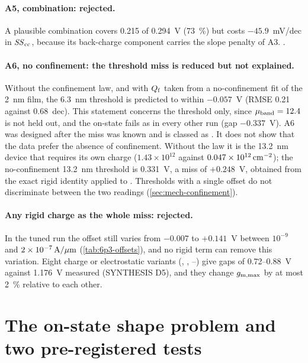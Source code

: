 \paragraph{A5, combination: rejected.} A plausible combination covers 0.215 of 0.294~V (73~\%) but costs $-45.9$~mV/dec in $\mathit{SS}_{\mathrm{cc}}$, because its back-charge component carries the slope penalty of A3. \evNUM.

\paragraph{A6, no confinement: the threshold miss is reduced but not explained.} Without the confinement law, and with $Q_{\mathrm{f}}$ taken from a no-confinement fit of the 2~nm film, the 6.3~nm threshold is predicted to within $-0.057$~V (RMSE 0.21 against 0.68~dec). This statement concerns the threshold only, since $\mu_{\mathrm{band}}=12.4$ is not held out, and the on-state fails as in every other run (gap $-0.337$~V). A6 was designed after the  miss was known and is classed as \evPOST. It does not show that the data prefer the absence of confinement. Without the law it is the 13.2~nm device that requires its own charge ($1.43\times10^{12}$ against $0.047\times10^{12}\,\mathrm{cm}^{-2}$); the no-confinement 13.2~nm threshold is 0.331~V, a miss of $+0.248$~V, obtained from the exact rigid identity applied to . Thresholds with a single offset do not discriminate between the two readings (\cref{sec:mech-confinement}).

\paragraph{Any rigid charge as the whole miss: rejected.} In the tuned run the offset still varies from $-0.007$ to $+0.141$~V between $10^{-9}$ and $2\times10^{-7}\,\mathrm{A}/\mu\mathrm{m}$ (\cref{tab:6p3-offsets}), and no rigid term can remove this variation. Eight charge or electrostatic variants (, , --) give gaps of 0.72--0.88~V against 1.176~V measured (SYNTHESIS D5), and they change $g_{\mathrm{m,max}}$ by at most 2~\% relative to each other.

\section{The on-state shape problem and two pre-registered tests}\label{sec:6p3-shape}

